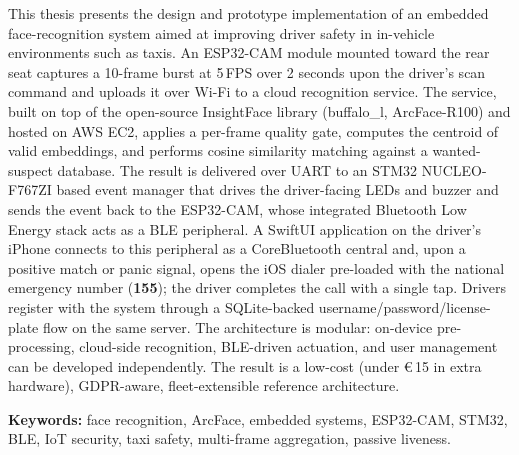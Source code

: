 This thesis presents the design and prototype implementation of an
embedded face-recognition system aimed at improving driver safety in
in-vehicle environments such as taxis. An ESP32-CAM module mounted toward
the rear seat captures a 10-frame burst at 5\,FPS over 2 seconds upon the
driver's scan command and uploads it over Wi-Fi to a cloud recognition
service. The service, built on top of the open-source InsightFace
library (buffalo\_l, ArcFace-R100) and hosted on AWS EC2, applies a
per-frame quality gate, computes the centroid of valid embeddings, and
performs cosine similarity matching against a wanted-suspect database.
The result is delivered over UART to an STM32 NUCLEO-F767ZI based event
manager that drives the driver-facing LEDs and buzzer and sends the
event back to the ESP32-CAM, whose integrated Bluetooth Low Energy stack
acts as a BLE peripheral. A SwiftUI application on the driver's iPhone
connects to this peripheral as a CoreBluetooth central and, upon a
positive match or panic signal, opens the iOS dialer pre-loaded with
the national emergency number (\textbf{155}); the driver completes the
call with a single tap. Drivers register with the system through a
SQLite-backed username/password/license-plate flow on the same server.
The architecture is modular: on-device pre-processing, cloud-side
recognition, BLE-driven actuation, and user management can be developed
independently. The result is a low-cost (under €\,15 in extra
hardware), GDPR-aware, fleet-extensible reference architecture.

\noindent\textbf{Keywords:} face recognition, ArcFace, embedded systems,
ESP32-CAM, STM32, BLE, IoT security, taxi safety, multi-frame aggregation,
passive liveness.

\cleardoublepage
